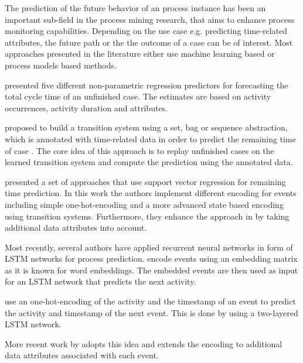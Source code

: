 
The prediction of the future behavior of an process instance has been an important sub-field in the process mining research, that aims to enhance process monitoring capabilities.
Depending on the use case e.g. predicting time-related attributes, the future path or the the outcome of a case can be of interest. 
Most approaches presented in the literature either use machine learning based or process models based methods.

 presented five different non-parametric regression predictors for forecasting the total cycle time of an unfinished case\cite{DBLP:conf/otm/DongenCA08}.
The estimates are based on activity occurrences, activity duration and attributes.

 proposed to build a transition system using a set, bag or sequence abstraction, which is annotated with time-related data in order to predict the remaining time of case \cite{DBLP:journals/is/AalstSS11}.
The core idea of this approach is to replay unfinished cases on the learned transition system and compute the prediction using the annotated data.

\citeauthor{DBLP:journals/computing/PolatoSBL18} presented a set of approaches that use support vector regression for remaining time prediction\cite{DBLP:journals/computing/PolatoSBL18}.
In this work the authors implement different encoding for events including simple one-hot-encoding and a more advanced state based encoding using transition systems.
Furthermore, they enhance the approach in  \cite{DBLP:journals/is/AalstSS11} by taking additional data attributes into account.

Most recently, several authors have applied recurrent neural networks in form of LSTM networks for process prediction. \citeauthor{ DBLP:conf/bpm/EvermannRF16} encode events using an embedding matrix as it is known for word embeddings. The embedded events are then used as input for an LSTM network that predicts the next activity\cite{DBLP:conf/bpm/EvermannRF16}.

\citeauthor{DBLP:conf/caise/TaxVRD17} use an one-hot-encoding of the activity and the timestamp of an event to predict the activity and timestamp of the next event. This is done by using a two-layered LSTM network\cite{DBLP:conf/caise/TaxVRD17}.

More recent work by \citeauthor{DBLP:conf/ssci/NavarinVPS17} adopts this idea and extends the encoding to additional data attributes associated with each event\cite{DBLP:conf/ssci/NavarinVPS17}.


